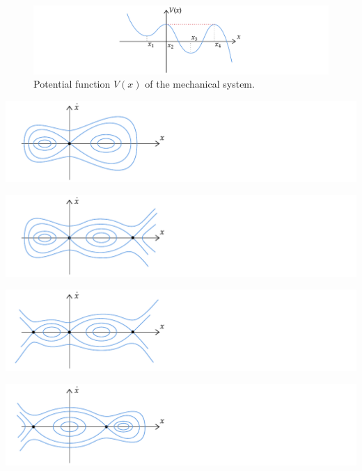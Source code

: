 \documentclass[twoside,10pt,a4paper]{article}
\begin{document}
\begin{figure}[H]
	\centering
	\includegraphics[scale=0.9]{Graphics/MCQ1_figures/Q21D01.pdf}
	\caption{Potential function $ V(x) $ of the mechanical system.}
\end{figure}

\begin{enumerate}[label=(\alph*)]
	\item \includegraphics[scale=0.8]{Graphics/MCQ1_figures/Q21D02.pdf}
	{\color{MyRed}\item \includegraphics[scale=0.8]{Graphics/MCQ1_figures/Q21D03.pdf}}
	\item \includegraphics[scale=0.8]{Graphics/MCQ1_figures/Q21D04.pdf}
	\item \includegraphics[scale=0.8]{Graphics/MCQ1_figures/Q21D05.pdf}
\end{enumerate}
\end{document}
